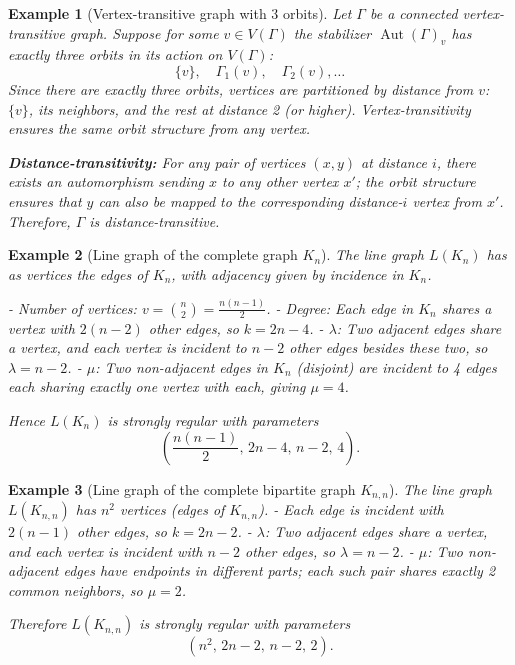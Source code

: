 \documentclass[12pt,a4paper,openany]{book}
\newtheorem{example}{Example}[section]
\begin{document}
\begin{example}[Vertex-transitive graph with 3 orbits]
Let $\Gamma$ be a connected vertex-transitive graph. Suppose for some $v \in V(\Gamma)$
the stabilizer $\operatorname{Aut}(\Gamma)_v$ has exactly three orbits in its action on $V(\Gamma)$:
\[
\{v\},\quad \Gamma_1(v),\quad \Gamma_2(v),\dots
\]
Since there are exactly three orbits, vertices are partitioned by distance from $v$: 
$\{v\}$, its neighbors, and the rest at distance 2 (or higher).  
Vertex-transitivity ensures the same orbit structure from any vertex.  

\medskip
\noindent
\textbf{Distance-transitivity:}  
For any pair of vertices $(x,y)$ at distance $i$, there exists an automorphism sending $x$ to any other vertex $x'$; the orbit structure ensures that $y$ can also be mapped to the corresponding distance-$i$ vertex from $x'$. Therefore, $\Gamma$ is distance-transitive.
\end{example}

\begin{example}[Line graph of the complete graph $K_n$]
The line graph $L(K_n)$ has as vertices the edges of $K_n$, with adjacency
given by incidence in $K_n$.  

- Number of vertices: $v = \binom{n}{2} = \frac{n(n-1)}{2}$.  
- Degree: Each edge in $K_n$ shares a vertex with $2(n-2)$ other edges, so $k = 2n-4$.  
- $\lambda$: Two adjacent edges share a vertex, and each vertex is incident to $n-2$ other edges besides these two, so $\lambda = n-2$.  
- $\mu$: Two non-adjacent edges in $K_n$ (disjoint) are incident to 4 edges each sharing exactly one vertex with each, giving $\mu = 4$.  

Hence $L(K_n)$ is strongly regular with parameters
\[
\left(\frac{n(n-1)}{2},\, 2n-4,\, n-2,\, 4\right).
\]
\end{example}

\begin{example}[Line graph of the complete bipartite graph $K_{n,n}$]
The line graph $L(K_{n,n})$ has $n^2$ vertices (edges of $K_{n,n}$).  
- Each edge is incident with $2(n-1)$ other edges, so $k = 2n-2$.  
- $\lambda$: Two adjacent edges share a vertex, and each vertex is incident with $n-2$ other edges, so $\lambda = n-2$.  
- $\mu$: Two non-adjacent edges have endpoints in different parts; each such pair shares exactly 2 common neighbors, so $\mu = 2$.  

Therefore $L(K_{n,n})$ is strongly regular with parameters
\[
(n^2,\, 2n-2,\, n-2,\, 2).
\]
\end{example}
\end{document}

